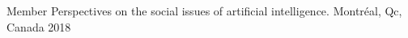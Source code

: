 

\begin{cvhonors}

  \cvhonor
    {Member} %
    {Perspectives on the social issues of artificial intelligence.} %
    {Montr\'eal, Qc, Canada} %
    {2018} %


\end{cvhonors}